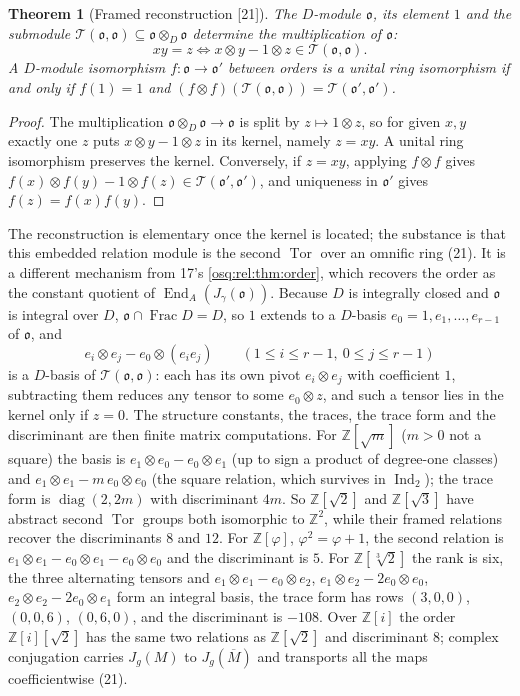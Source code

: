\documentclass[11pt,letterpaper]{article}
\numberwithin{equation}{section}
\newtheorem{theorem}{Theorem}[section]
\theoremstyle{definition}
\theoremstyle{remark}
\theoremstyle{plain}
\newcommand{\Z}{\mathbb Z}
\newcommand{\End}{\operatorname{End}}
\newcommand{\Frac}{\operatorname{Frac}}
\newcommand{\Tor}{\operatorname{Tor}}
\newcommand{\src}[1]{\textup{\textsf{[#1]}}}
\begin{document}
\begin{theorem}[Framed reconstruction \src{21}]\label{osq:da:thm:reconstruction}
The $D$-module $\mathfrak o$, its element $1$ and the submodule $\mathcal T(\mathfrak o,\mathfrak o)\subseteq\mathfrak o\otimes_D\mathfrak o$ determine the
multiplication of $\mathfrak o$:
\[
 xy=z\iff x\otimes y-1\otimes z\in\mathcal T(\mathfrak o,\mathfrak o).
\]
A $D$-module isomorphism $f:\mathfrak o\to\mathfrak o'$ between orders is a unital ring isomorphism if and only if $f(1)=1$ and
$(f\otimes f)(\mathcal T(\mathfrak o,\mathfrak o))=\mathcal T(\mathfrak o',\mathfrak o')$.
\end{theorem}
\begin{proof}
The multiplication $\mathfrak o\otimes_D\mathfrak o\to\mathfrak o$ is split by $z\mapsto1\otimes z$, so for given $x,y$ exactly one $z$ puts
$x\otimes y-1\otimes z$ in its kernel, namely $z=xy$. A unital ring isomorphism preserves the kernel. Conversely, if $z=xy$, applying $f\otimes f$
gives $f(x)\otimes f(y)-1\otimes f(z)\in\mathcal T(\mathfrak o',\mathfrak o')$, and uniqueness in $\mathfrak o'$ gives $f(z)=f(x)f(y)$.
\end{proof}

The reconstruction is elementary once the kernel is located; the substance is that this embedded relation module is the second $\Tor$ over an
omnific ring (21). It is a different mechanism from 17's \cref{osq:rel:thm:order}, which recovers the order as the constant quotient of
$\End_A(J_\gamma(\mathfrak o))$. Because $D$ is integrally closed and $\mathfrak o$ is integral over $D$, $\mathfrak o\cap\Frac D=D$, so $1$ extends to
a $D$-basis $e_0=1,e_1,\dots,e_{r-1}$ of $\mathfrak o$, and
\[
 e_i\otimes e_j-e_0\otimes(e_ie_j)\qquad(1\le i\le r-1,\ 0\le j\le r-1)
\]
is a $D$-basis of $\mathcal T(\mathfrak o,\mathfrak o)$: each has its own pivot $e_i\otimes e_j$ with coefficient $1$, subtracting them reduces any
tensor to some $e_0\otimes z$, and such a tensor lies in the kernel only if $z=0$. The structure constants, the traces, the trace form and
the discriminant are then finite matrix computations. For $\Z[\sqrt m]$ ($m>0$ not a square) the basis is $e_1\otimes e_0-e_0\otimes e_1$ (up to
sign a product of degree-one classes) and $e_1\otimes e_1-m\,e_0\otimes e_0$ (the square relation, which survives in $\operatorname{Ind}_2$); the
trace form is $\operatorname{diag}(2,2m)$ with discriminant $4m$. So $\Z[\sqrt2]$ and $\Z[\sqrt3]$ have abstract second $\Tor$ groups both
isomorphic to $\Z^2$, while their framed relations recover the discriminants $8$ and $12$. For $\Z[\varphi]$, $\varphi^2=\varphi+1$, the second
relation is $e_1\otimes e_1-e_0\otimes e_1-e_0\otimes e_0$ and the discriminant is $5$. For $\Z[\sqrt[3]2]$ the rank is six, the three
alternating tensors and $e_1\otimes e_1-e_0\otimes e_2$, $e_1\otimes e_2-2e_0\otimes e_0$, $e_2\otimes e_2-2e_0\otimes e_1$ form an integral
basis, the trace form has rows $(3,0,0)$, $(0,0,6)$, $(0,6,0)$, and the discriminant is $-108$. Over $\Z[i]$ the order $\Z[i][\sqrt2]$ has the
same two relations as $\Z[\sqrt2]$ and discriminant $8$; complex conjugation carries $J_g(M)$ to $J_g(\overline M)$ and transports all the maps
coefficientwise (21).
\end{document}
